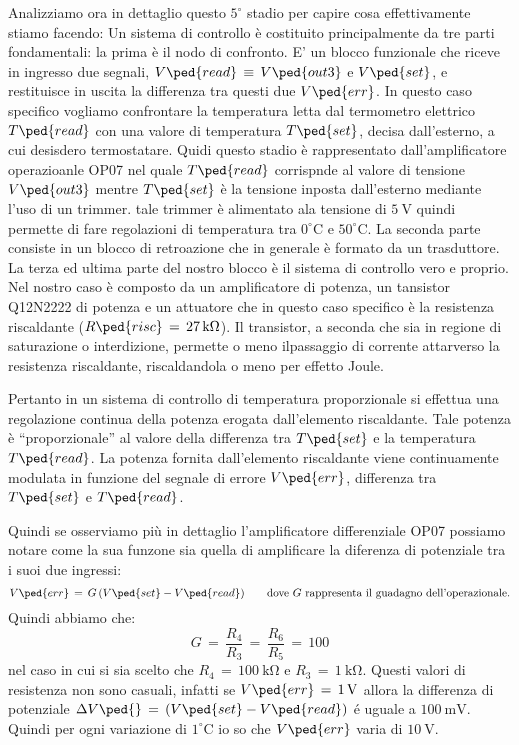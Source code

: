 Analizziamo ora in dettaglio questo $5^\circ$ stadio per capire cosa effettivamente stiamo facendo:
Un sistema di controllo è costituito principalmente da tre parti fondamentali: la prima è il nodo di confronto. E' un blocco funzionale che riceve in ingresso due segnali, $V\ped{read}\,\equiv\,V\ped{out3}$ e $V\ped{set}$, e restituisce in uscita la differenza tra questi due $V\ped{err}$. In questo caso specifico vogliamo confrontare la temperatura letta dal termometro elettrico $T\ped{read}$ con una valore di temperatura $T\ped{set}$, decisa dall'esterno, a cui desisdero termostatare. Quidi questo stadio è rappresentato dall'amplificatore operazioanle OP07 nel quale $T\ped{read}$ corrispnde al valore di tensione $V\ped{out3}$ mentre $T\ped{set}$ è la tensione inposta dall'esterno mediante l'uso di un trimmer. tale trimmer è alimentato ala tensione di $\SI{5}{\volt}$ quindi permette di fare regolazioni di temperatura tra $0^\circ$C e $50^\circ$C.
La seconda parte consiste in un blocco di retroazione che in generale è formato da un trasduttore.
La terza ed ultima parte del nostro blocco è il sistema di controllo vero e proprio. Nel nostro caso è composto da un amplificatore di potenza, un tansistor Q12N2222 di potenza e un attuatore che in questo caso specifico è la resistenza riscaldante ($R\ped{risc}\,=\,\SI{27}{\kilo\ohm}$). Il transistor, a seconda che sia in regione di saturazione o interdizione, permette o meno ilpassaggio di corrente attarverso la resistenza riscaldante, riscaldandola o meno per effetto Joule.

Pertanto in un sistema di controllo di temperatura proporzionale si effettua una regolazione continua della potenza erogata
dall’elemento riscaldante. Tale potenza è “proporzionale” al valore della differenza tra $T\ped{set}$ e la temperatura $T\ped{read}$. La potenza fornita dall’elemento riscaldante viene continuamente modulata in funzione del segnale di errore $V\ped{err}$, differenza tra $T\ped{set}$ e $T\ped{read}$.

Quindi se osserviamo più in dettaglio l'amplificatore differenziale OP07 possiamo notare come la sua funzone sia quella di amplificare la diferenza di potenziale tra i suoi due ingressi:
\begin{equation}
	V\ped{err}\,=\,G\,(V\ped{set} - V\ped{read}) \qquad \text{dove $G$ rappresenta il guadagno dell'operazionale.}
\end{equation}
Quindi abbiamo che: 
\begin{equation}
	G\,=\,\frac{R_4}{R_3}\,=\,\frac{R_6}{R_5}\,=\,100
\end{equation}
nel caso in cui si sia scelto che $R_4\,=\,\SI{100}{\kilo\ohm}$ e $R_3\,=\,\SI{1}{\kilo\ohm}$. Questi valori di resistenza non sono casuali, infatti se $V\ped{err}\,=\,\SI{1}{\volt}$ allora la differenza di potenziale $\Delta V\ped{}\,=\, (V\ped{set} - V\ped{read})$ é uguale a $\SI{100}{\milli\volt}$. Quindi per ogni variazione di $1^\circ$C io so che $V\ped{err}$ varia di $\SI{10}{\volt}$.

